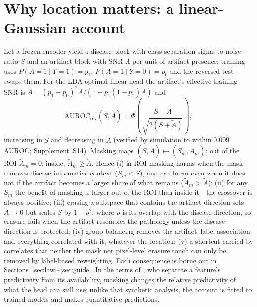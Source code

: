 \section{Why location matters: a linear-Gaussian account}\label{sec:theory}
Let a frozen encoder yield a disease block with class-separation signal-to-noise ratio $S$ and an artifact block with
SNR $A$ per unit of artifact presence; training uses $P(A{=}1\mid Y{=}1)=p_1$, $P(A{=}1\mid Y{=}0)=p_0$ and the
reversed test swaps them. For the LDA-optimal linear head the artifact's effective training SNR is
$\tilde A=(p_1-p_0)^2A/(1+p_1(1-p_1)A)$ and
\begin{equation}
\mathrm{AUROC}_{\mathrm{rev}}(S,\tilde A)=\Phi\!\left(\frac{S-\tilde A}{\sqrt{2(S+\tilde A)}}\right),
\end{equation}
increasing in $S$ and decreasing in $\tilde A$ (verified by simulation to within 0.009 AUROC; Supplement~S14).
Masking maps $(S,\tilde A)\mapsto(S_m,\tilde A_m)$: out of the ROI $\tilde A_m=0$; inside, $\tilde A_m\ge\tilde A$.
Hence (i) in-ROI masking harms when the mask removes disease-informative context ($S_m<S$), and can harm even when it
does not if the artifact becomes a larger share of what remains ($\tilde A_m>\tilde A$); (ii) for any $S_m$ the benefit of masking is larger out of the ROI
than inside it---the crossover is always positive; (iii) erasing a subspace that contains the artifact direction sets
$\tilde A\to0$ but scales $S$ by $1-\rho^2$, where $\rho$ is its overlap with the disease direction, so erasure fails
when the artifact resembles the pathology unless the disease direction is protected; (iv) group balancing removes the artifact--label association and everything
correlated with it, whatever the location; (v) a shortcut carried by correlates that neither the mask nor pixel-level
erasure touch can only be removed by label-based reweighting. Each consequence is borne out in
Sections~\ref{sec:law}--\ref{sec:guide}. In the terms of \citet{hermann2024foundations}, who separate a feature's
predictivity from its availability, masking changes the relative predictivity of what the head can still use; unlike
that synthetic analysis, the account is fitted to trained models and makes quantitative predictions.

